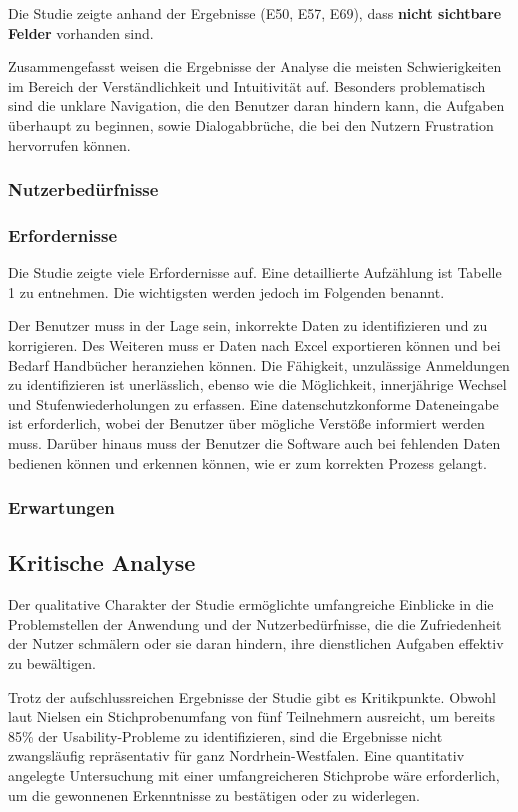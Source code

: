 Die Studie zeigte anhand der Ergebnisse (E50, E57, E69), dass \textbf{nicht sichtbare Felder} vorhanden sind.

Zusammengefasst weisen die Ergebnisse der Analyse die meisten Schwierigkeiten im Bereich der Verständlichkeit und Intuitivität auf. Besonders problematisch sind die unklare Navigation, die den Benutzer daran hindern kann, die Aufgaben überhaupt zu beginnen, sowie Dialogabbrüche, die bei den Nutzern Frustration hervorrufen können.

\subsubsection{Nutzerbedürfnisse}
\label{section-beduerfnisse}
\subsubsection{Erfordernisse}
Die Studie zeigte viele Erfordernisse auf. Eine detaillierte Aufzählung ist Tabelle 1 zu entnehmen. Die wichtigsten werden jedoch im Folgenden benannt.

Der Benutzer muss in der Lage sein, inkorrekte Daten zu identifizieren und zu korrigieren. Des Weiteren muss er Daten nach Excel exportieren können und bei Bedarf Handbücher heranziehen können. Die Fähigkeit, unzulässige Anmeldungen zu identifizieren ist unerlässlich, ebenso wie die Möglichkeit, innerjährige Wechsel und Stufenwiederholungen zu erfassen. Eine datenschutzkonforme Dateneingabe ist erforderlich, wobei der Benutzer über mögliche Verstöße informiert werden muss. Darüber hinaus muss der Benutzer die Software auch bei fehlenden Daten bedienen können und erkennen können, wie er zum korrekten Prozess gelangt.

\subsubsection{Erwartungen}





\subsection{Kritische Analyse}
Der qualitative Charakter der Studie ermöglichte umfangreiche Einblicke in die Problemstellen der Anwendung und der Nutzerbedürfnisse, die die Zufriedenheit der Nutzer schmälern oder sie daran hindern, ihre dienstlichen Aufgaben effektiv zu bewältigen. 

Trotz der aufschlussreichen Ergebnisse der Studie gibt es Kritikpunkte. Obwohl laut Nielsen ein Stichprobenumfang von fünf Teilnehmern ausreicht, um bereits 85\% der Usability-Probleme zu identifizieren\cite{Nielsen5Teilnehmer}, sind die Ergebnisse nicht zwangsläufig repräsentativ für ganz Nordrhein-Westfalen. Eine quantitativ angelegte Untersuchung mit einer umfangreicheren Stichprobe wäre erforderlich, um die gewonnenen Erkenntnisse zu bestätigen oder zu widerlegen.


